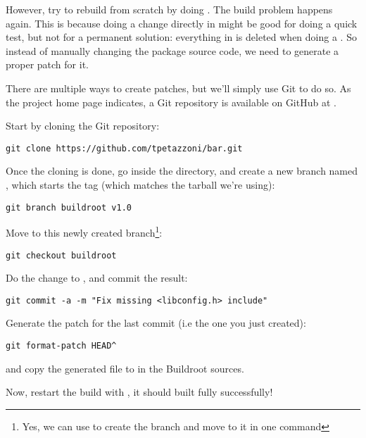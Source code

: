 However, try to rebuild  from scratch by doing . The build problem happens again. This is because
doing a change directly in  might be good for
doing a quick test, but not for a permanent solution: everything in
 is deleted when doing a . So instead of
manually changing the package source code, we need to generate a
proper patch for it.

There are multiple ways to create patches, but we'll simply use Git to
do so. As the  project home page indicates, a Git repository
is available on GitHub at .

Start by cloning the Git repository:

\begin{verbatim}
git clone https://github.com/tpetazzoni/bar.git
\end{verbatim}

Once the cloning is done, go inside the  directory, and
create a new branch named , which starts the
 tag (which matches the  tarball we're
using):

\begin{verbatim}
git branch buildroot v1.0
\end{verbatim}

Move to this newly created branch\footnote{Yes, we can use  to create the branch and move to it in one command}:

\begin{verbatim}
git checkout buildroot
\end{verbatim}

Do the  change to , and
commit the result:

\begin{verbatim}
git commit -a -m "Fix missing <libconfig.h> include"
\end{verbatim}

Generate the patch for the last commit (i.e the one you just created):

\begin{verbatim}
git format-patch HEAD^
\end{verbatim}

and copy the generated  file to 
in the Buildroot sources.

Now, restart the build with , it should
built fully successfully!


